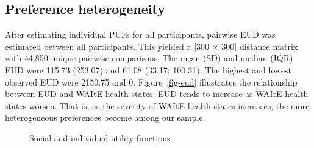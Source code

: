 \documentclass[
  number,
  preprint]{elsarticle}
\begin{document}
\subsection{Preference heterogeneity}\label{preference-heterogeneity-1}

After estimating individual PUFs for all participants, pairwise EUD was
estimated between all participants. This yielded a {[}300 \(\times\)
300{]} distance matrix with 44,850 unique pairwise comparisons. The mean
(SD) and median (IQR) EUD were 115.73 (253.07) and 61.08 (33.17;
100.31). The highest and lowest observed EUD were 2150.75 and 0.
Figure~\ref{fig-eud} illustrates the relationship between EUD and WAItE
health states. EUD tends to increase as WAItE health states worsen. That
is, as the severity of WAItE health states increases, the more
heterogeneous preferences become among our sample.

\begin{figure}


\caption{\label{fig-sufplain}Social and individual utility functions}

\end{figure}%
\end{document}
